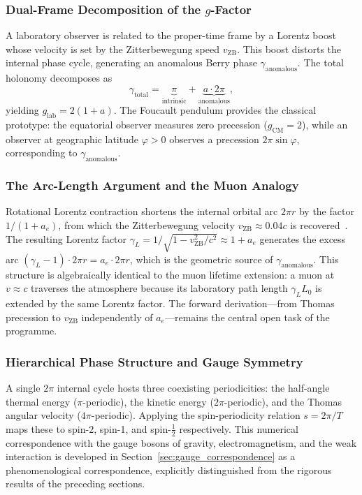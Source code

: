 \documentclass[%
 reprint,
 amsmath,amssymb,
 aps,
 prb,
]{revtex4-2}
\numberwithin{equation}{section}
\theoremstyle{definition}
\theoremstyle{remark}
\begin{document}
\subsubsection{Dual-Frame Decomposition of the \texorpdfstring{$g$}{g}-Factor}

A laboratory observer is related to the proper-time frame by a Lorentz boost whose velocity is set by the Zitterbewegung speed $v_{\text{ZB}}$. This boost distorts the internal phase cycle, generating an anomalous Berry phase $\gamma_{\text{anomalous}}$. The total holonomy decomposes as
\begin{equation}
\gamma_{\text{total}} = \underbrace{\pi}_{\text{intrinsic}} + \underbrace{a \cdot 2\pi}_{\text{anomalous}},
\label{eq:gamma_decomp_intro}
\end{equation}
yielding $g_{\text{lab}} = 2(1+a)$. The Foucault pendulum provides the classical prototype: the equatorial observer measures zero precession ($g_{\text{CM}} = 2$), while an observer at geographic latitude $\varphi > 0$ observes a precession $2\pi\sin\varphi$, corresponding to $\gamma_{\text{anomalous}}$.

\subsubsection{The Arc-Length Argument and the Muon Analogy}

Rotational Lorentz contraction shortens the internal orbital arc $2\pi r$ by the factor $1/(1+a_e)$, from which the Zitterbewegung velocity $v_{\text{ZB}} \approx 0.04c$ is recovered~\cite{Hanamura_2026_35}. The resulting Lorentz factor $\gamma_L = 1/\sqrt{1-v_{\text{ZB}}^2/c^2} \approx 1 + a_e$ generates the excess arc $(\gamma_L - 1)\cdot 2\pi r = a_e \cdot 2\pi r$, which is the geometric source of $\gamma_{\text{anomalous}}$. This structure is algebraically identical to the muon lifetime extension: a muon at $v \approx c$ traverses the atmosphere because its laboratory path length $\gamma_L L_0$ is extended by the same Lorentz factor. The forward derivation---from Thomas precession to $v_{\text{ZB}}$ independently of $a_e$---remains the central open task of the programme.

\subsubsection{Hierarchical Phase Structure and Gauge Symmetry}

A single $2\pi$ internal cycle hosts three coexisting periodicities: the half-angle thermal energy ($\pi$-periodic), the kinetic energy ($2\pi$-periodic), and the Thomas angular velocity ($4\pi$-periodic). Applying the spin-periodicity relation $s = 2\pi/T$ maps these to spin-2, spin-1, and spin-$\tfrac{1}{2}$ respectively. This numerical correspondence with the gauge bosons of gravity, electromagnetism, and the weak interaction is developed in Section~\ref{sec:gauge_correspondence} as a phenomenological correspondence, explicitly distinguished from the rigorous results of the preceding sections.
\end{document}
